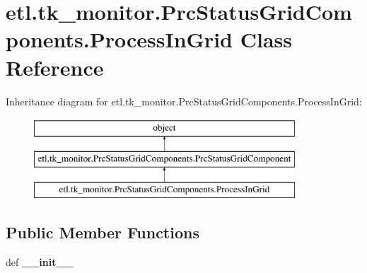 \hypertarget{classetl_1_1tk__monitor_1_1PrcStatusGridComponents_1_1ProcessInGrid}{\section{etl.\-tk\-\_\-monitor.\-Prc\-Status\-Grid\-Components.\-Process\-In\-Grid Class Reference}
\label{classetl_1_1tk__monitor_1_1PrcStatusGridComponents_1_1ProcessInGrid}
}
Inheritance diagram for etl.\-tk\-\_\-monitor.\-Prc\-Status\-Grid\-Components.\-Process\-In\-Grid\-:\begin{figure}[H]
\begin{center}
\leavevmode
\includegraphics[height=3.000000cm]{classetl_1_1tk__monitor_1_1PrcStatusGridComponents_1_1ProcessInGrid}
\end{center}
\end{figure}
\subsection*{Public Member Functions}
\begin{DoxyCompactItemize}
\item 
\hypertarget{classetl_1_1tk__monitor_1_1PrcStatusGridComponents_1_1ProcessInGrid_ae15b56054378b76c33844086ac326c1a}{def {\bfseries \-\_\-\-\_\-init\-\_\-\-\_\-}}\label{classetl_1_1tk__monitor_1_1PrcStatusGridComponents_1_1ProcessInGrid_ae15b56054378b76c33844086ac326c1a}

\end{DoxyCompactItemize}
